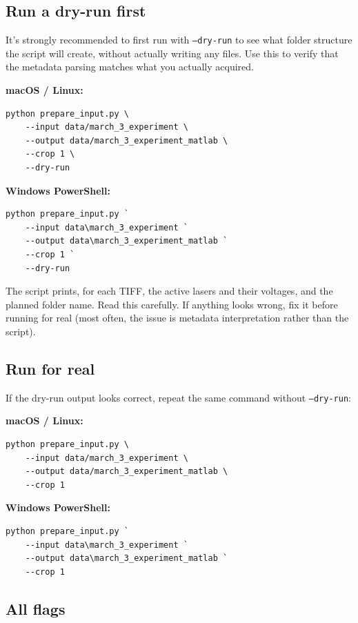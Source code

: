 \documentclass[11pt]{article}
\newcommand{\code}[1]{\texttt{#1}}
\begin{document}
\subsection*{Run a dry-run first}

It's strongly recommended to first run with \code{--dry-run} to see
what folder structure the script will create, without actually
writing any files. Use this to verify that the metadata parsing matches
what you actually acquired.

\textbf{macOS / Linux:}

\begin{lstlisting}
python prepare_input.py \
    --input data/march_3_experiment \
    --output data/march_3_experiment_matlab \
    --crop 1 \
    --dry-run
\end{lstlisting}

\textbf{Windows PowerShell:}

\begin{lstlisting}
python prepare_input.py `
    --input data\march_3_experiment `
    --output data\march_3_experiment_matlab `
    --crop 1 `
    --dry-run
\end{lstlisting}

The script prints, for each TIFF, the active lasers and their
voltages, and the planned folder name. Read this carefully. If
anything looks wrong, fix it before running for real (most often, the
issue is metadata interpretation rather than the script).

\subsection*{Run for real}

If the dry-run output looks correct, repeat the same command without
\code{--dry-run}:

\textbf{macOS / Linux:}

\begin{lstlisting}
python prepare_input.py \
    --input data/march_3_experiment \
    --output data/march_3_experiment_matlab \
    --crop 1
\end{lstlisting}

\textbf{Windows PowerShell:}

\begin{lstlisting}
python prepare_input.py `
    --input data\march_3_experiment `
    --output data\march_3_experiment_matlab `
    --crop 1
\end{lstlisting}

\subsection*{All flags}
\end{document}
